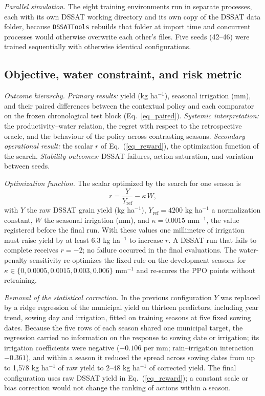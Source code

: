 \documentclass[times,final,authoryear]{elsarticle}
\begin{document}
\emph{Parallel simulation.} The eight training environments run in separate processes, each with its own DSSAT working directory and its own copy of the DSSAT data folder, because \texttt{DSSATTools} rebuilds that folder at import time and concurrent processes would otherwise overwrite each other's files. Five seeds (42--46) were trained sequentially with otherwise identical configurations.

\subsection{Objective, water constraint, and risk metric}
\label{subobjective}

\emph{Outcome hierarchy.} \emph{Primary results:} yield (kg ha$^{-1}$), seasonal irrigation (mm), and their paired differences between the contextual policy and each comparator on the frozen chronological test block (Eq.~\ref{eq_paired}). \emph{Systemic interpretation:} the productivity--water relation, the regret with respect to the retrospective oracle, and the behaviour of the policy across contrasting seasons. \emph{Secondary operational result:} the scalar $r$ of Eq.~(\ref{eq_reward}), the optimization function of the search. \emph{Stability outcomes:} DSSAT failures, action saturation, and variation between seeds.

\emph{Optimization function.} The scalar optimized by the search for one season is
\begin{equation}
r = \frac{Y}{Y_{\text{ref}}} - \kappa\, W,
\label{eq_reward}
\end{equation}
with $Y$ the raw DSSAT grain yield (kg ha$^{-1}$), $Y_{\text{ref}} = 4200$ kg ha$^{-1}$ a normalization constant, $W$ the seasonal irrigation (mm), and $\kappa = 0.0015$ mm$^{-1}$, the value registered before the final run. With these values one millimetre of irrigation must raise yield by at least 6.3 kg ha$^{-1}$ to increase $r$. A DSSAT run that fails to complete receives $r = -2$; no failure occurred in the final evaluations. The water-penalty sensitivity re-optimizes the fixed rule on the development seasons for $\kappa \in \{0, 0.0005, 0.0015, 0.003, 0.006\}$ mm$^{-1}$ and re-scores the PPO points without retraining.

\emph{Removal of the statistical correction.} In the previous configuration $Y$ was replaced by a ridge regression of the municipal yield on thirteen predictors, including year trend, sowing day and irrigation, fitted on training seasons at five fixed sowing dates. Because the five rows of each season shared one municipal target, the regression carried no information on the response to sowing date or irrigation; its irrigation coefficients were negative ($-0.106$ per mm; rain--irrigation interaction $-0.361$), and within a season it reduced the spread across sowing dates from up to 1,578 kg ha$^{-1}$ of raw yield to 2--48 kg ha$^{-1}$ of corrected yield. The final configuration uses raw DSSAT yield in Eq.~(\ref{eq_reward}); a constant scale or bias correction would not change the ranking of actions within a season.
\end{document}
